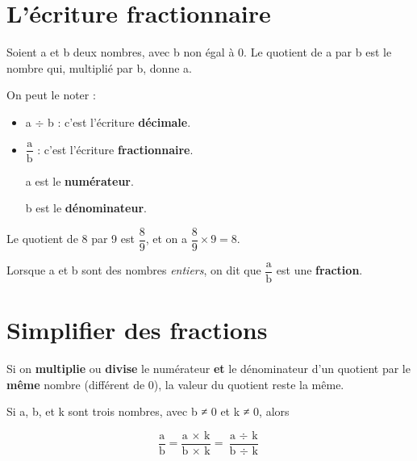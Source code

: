 \documentclass[../€Cours-complet/Cours-complet]{subfiles}
\begin{document}
\maketitle

\section{L'écriture fractionnaire}

\begin{cours}
	Soient a et b deux nombres, avec b non égal à 0. Le quotient de a par b est le nombre qui, multiplié par b, donne a.

	On peut le noter :
	\begin{itemize}
		\item a $÷$ b : c'est l'écriture \textbf{décimale}.
		\item $\dfrac{\text{a}}{\text{b}}$ : c'est l'écriture \textbf{fractionnaire}.

		      a est le \textbf{numérateur}.

		      b est le \textbf{dénominateur}.
	\end{itemize}
\end{cours}


\begin{exemple}
	Le quotient de 8 par 9 est $\dfrac{8}{9}$, et on a $\dfrac{8}{9} × 9 = 8$.
\end{exemple}

\begin{cours}[Fractions]
	Lorsque a et b sont des nombres \textit{entiers}, on dit que $\dfrac{\text{a}}{\text{b}}$ est une \textbf{fraction}.
\end{cours}

\section{Simplifier des fractions}

\begin{cours}
	Si on \textbf{multiplie} ou \textbf{divise} le numérateur \textbf{et} le dénominateur d'un quotient par le \textbf{même} nombre (différent de 0), la valeur du quotient reste la même.

	Si a, b, et k sont trois nombres, avec b ≠ 0 et k ≠ 0, alors

	$$ \dfrac{\text{a}}{\text{b}} = \dfrac{\text{a × k}}{\text{b × k}} = \dfrac{\text{a }÷\text{ k}}{\text{b }÷\text{ k}} $$
\end{cours}
\end{document}
